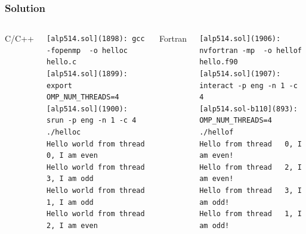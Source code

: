 \documentclass[10pt,t]{beamer}
\begin{document}
\begin{frame}[fragile]
  \frametitle{Solution}
  \begin{columns}
    \begin{exampleblock}{C/C++}
      
    \end{exampleblock}
    \begin{block}{}
      {\fontsize{4}{5}\selectfont
        \begin{Verbatim}
[alp514.sol](1898): gcc -fopenmp  -o helloc hello.c
[alp514.sol](1899): export OMP_NUM_THREADS=4
[alp514.sol](1900): srun -p eng -n 1 -c 4 ./helloc
Hello world from thread 0, I am even
Hello world from thread 3, I am odd
Hello world from thread 1, I am odd
Hello world from thread 2, I am even
        \end{Verbatim}
      }
    \end{block}
    \begin{exampleblock}{Fortran}
      
    \end{exampleblock}
    \begin{block}{}
      {\fontsize{4}{5}\selectfont
        \begin{Verbatim}
[alp514.sol](1906): nvfortran -mp  -o hellof hello.f90
[alp514.sol](1907): interact -p eng -n 1 -c 4
[alp514.sol-b110](893): OMP_NUM_THREADS=4 ./hellof
Hello from thread   0, I am even!
Hello from thread   2, I am even!
Hello from thread   3, I am odd!
Hello from thread   1, I am odd!
        \end{Verbatim}
      }
    \end{block}
  \end{columns}
\end{frame}
\end{document}
